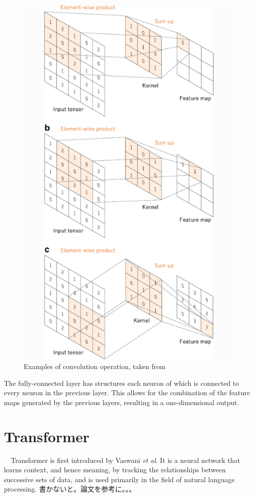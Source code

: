 \begin{figure}[p]
  \centering
  \includegraphics[width=110truemm]{resources/2_background/ex-convolution.png}
  \caption{
    Examples of convolution operation,
    taken from \cite{yamashita2018convolutional}
  }
  \label{convolution-process}
\end{figure}
\clearpage

The fully-connected layer has structures each neuron of which is connected 
to every neuron in the previous layer. This allows for the combination of 
the feature maps generated by the previous layers, resulting in a 
one-dimensional output.  

\section{Transformer}
　Transformer is first introduced by Vaswani \textit{et al}. \cite{vaswani2017attention}
It is a neural network that learns context, and hence meaning, by tracking the
relationships between successive sets of data, and is used primarily in the 
field of natural language processing.
書かないと。論文を参考に。。。
